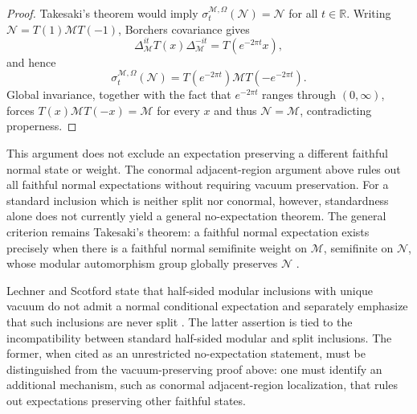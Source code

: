 \documentclass[a4paper,11pt]{article}
\theoremstyle{definition}
\begin{document}
\begin{proof}
Takesaki's theorem would imply
$\sigma_t^{\mathcal M,\Omega}(\mathcal N)=\mathcal N$ for all $t\in\mathbb R$.
Writing $\mathcal N=T(1)\mathcal M T(-1)$, Borchers covariance gives
\begin{equation}
 \Delta_{\mathcal M}^{it}T(x)\Delta_{\mathcal M}^{-it}
 =T(e^{-2\pi t}x),
\end{equation}
and hence
\begin{equation}
 \sigma_t^{\mathcal M,\Omega}(\mathcal N)
 =T(e^{-2\pi t})\mathcal M T(-e^{-2\pi t}).
\end{equation}
Global invariance, together with the fact that $e^{-2\pi t}$ ranges through
$(0,\infty)$, forces $T(x)\mathcal M T(-x)=\mathcal M$ for every $x$ and thus
$\mathcal N=\mathcal M$, contradicting properness.
\end{proof}

This argument does not exclude an expectation preserving a different faithful
normal state or weight.  The conormal adjacent-region argument above rules out
all faithful normal expectations without requiring vacuum preservation.  For a
standard inclusion which is neither split nor conormal, however, standardness
alone does not currently yield a general no-expectation theorem.  The general
criterion remains Takesaki's theorem: a faithful normal expectation exists
precisely when there is a faithful normal semifinite weight on $\mathcal M$,
semifinite on $\mathcal N$, whose modular automorphism group globally preserves
$\mathcal N$ \cite{Takesaki1972}.

Lechner and Scotford state that half-sided modular inclusions with unique
vacuum do not admit a normal conditional expectation and separately emphasize
that such inclusions are never split \cite[Section~2]{LechnerScotford2022}.
The latter assertion is tied to the incompatibility between standard
half-sided modular and split inclusions.  The former, when cited as an
unrestricted no-expectation statement, must be distinguished from the
vacuum-preserving proof above: one must identify an additional mechanism, such
as conormal adjacent-region localization, that rules out expectations
preserving other faithful states.










\end{document}
